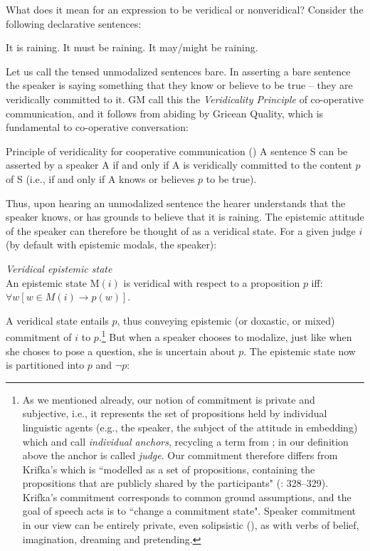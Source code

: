 \documentclass[output=paper,colorlinks,citecolor=brown]{langscibook}
\begin{document}
  What does it mean for an expression to be veridical or nonveridical? Consider the following declarative sentences:
  
\ea \ea It is raining.
\ex It must be raining. 
\ex It may/might be raining. 
\z
\z

Let us call the tensed unmodalized sentences bare. In asserting a bare sentence the speaker is saying something that they know or believe to be true --  they are veridically committed to it. GM call this the \textit{Veridicality Principle} of co-operative communication, and it follows from abiding by Gricean Quality, which is fundamental to co-operative conversation:


\ea Principle of veridicality for cooperative communication (\citealt{giannakidoumari2021a, giannakidoumari2021b})
\sn A sentence S can be asserted by a speaker A if and only if A is veridically committed to the content $p$ of S (i.e., if and only if A knows or believes $p$ to be true).
\z


Thus, upon hearing an unmodalized sentence the hearer understands that the speaker knows, or has grounds to believe that it is raining. The epistemic attitude of the speaker can therefore be thought of as a veridical state. For a given judge $i$ (by default with epistemic modals, the speaker): 

   \ea 	\textit{Veridical epistemic state}\\ 
  An epistemic state M$(i)$ is veridical with respect to a proposition $p$ iff:    $\forall w [w \in M(i) \rightarrow p(w)]$. 
  \z
   
 A veridical state entails $p$, thus conveying epistemic (or doxastic, or mixed) commitment of $i$ to $p$.\footnote{As we mentioned already, our notion of commitment  is private and subjective, i.e., it represents the set of propositions held by individual linguistic agents (e.g., the speaker, the subject of the attitude in embedding) which \citet{giannakidou1997} and \citet{giannakidoumari2016, giannakidoumari2018b, giannakidoumari2021a, giannakidoumari2021b} call \textit{individual anchors}, recycling a term from \citet{farkas1985}; in our definition above the anchor is called \textit{judge}. Our commitment therefore differs from Krifka's which is ``modelled as a set of propositions, containing the propositions that are publicly shared by the participants" (\citealt{krifka2015SALT}: 328--329). Krifka's commitment corresponds to common ground assumptions, and the goal of speech acts is to ``change a commitment state". Speaker commitment in our view can be entirely private, even solipsistic (\citealt{giannakidoumari2016, giannakidoumari2018a, giannakidoumari2018b, giannakidoumari2021a, giannakidoumari2021b}), as with verbs of belief, imagination, dreaming and pretending.}   But when a speaker chooses to modalize, just like when she choses to pose a question, she is uncertain about $p$. The epistemic state now is partitioned into  $p$ and $\neg p$:
\end{document}
